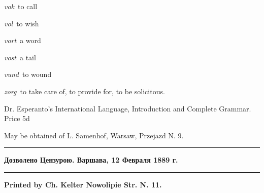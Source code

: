 \begin{landscape}
\begin{multicols}{5}
\begin{outdent}{1em}
\emph{vok\,} to call

\emph{vol\,} to wish

\emph{vort\,} a word

\emph{vost\,} a tail

\emph{vund\,} to wound
\end{outdent}


\begin{outdent}{1em}
\emph{zorg\,} to take care of, to provide for, to be solicitous.
\end{outdent}

\end{multicols}

\begin{center}
{\leftpointright \hspace{1em} Dr. Esperanto's International Language, Introduction and Complete Grammar. Price 5d\hspace{1em}\rightpointleft}

{\small May be obtained of L. Samenhof, Warsaw, Przejazd N. 9.}

\begin{minipage}[t]{7cm}
\rule{7cm}{0.4pt}
\bf\scriptsize Дозволено Цензурою. Варшава, 12 Февраля 1889 г. 
\end{minipage}
\begin{minipage}[t]{4cm}
\hspace{4cm}
\end{minipage}
\begin{minipage}[t]{7cm}
\begin{flushright}
\rule{7cm}{0.4pt}
\bf\scriptsize Printed by Ch. Kelter Nowolipie Str. N. 11.
\end{flushright}
\end{minipage}
\end{center}
\end{landscape}
\restoregeometry

\setlength{\parindent}{\savedparindent}